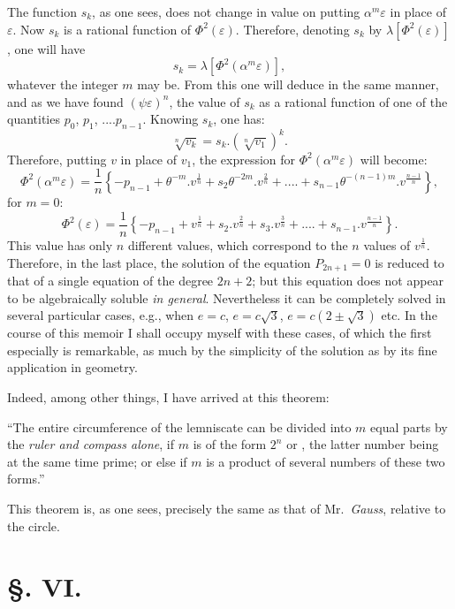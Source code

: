\documentclass{article}
\begin{document}
The function $s_{k}$, as one sees, does not change in value on putting $\alpha^{m}\varepsilon$ in place of $\varepsilon$. Now $s_{k}$ is a rational function of $\Phi^{2}(\varepsilon)$. Therefore, denoting $s_{k}$ by $\lambda[\Phi^{2}(\varepsilon)]$, one will have
\[ s_{k}=\lambda[\Phi^{2}(\alpha^{m}\varepsilon)], \]
whatever the integer $m$ may be. From this one will deduce in the same manner, and as we have found $(\psi\varepsilon)^{n}$, the value of $s_{k}$ as a rational function of one of the quantities $p_{0}$, $p_{1}$, $....p_{n-1}$. Knowing $s_{k}$, one has:
\[ \sqrt[n]{v_{k}}=s_{k}.(\sqrt[n]{v_{1}})^{k}. \]
Therefore, putting $v$ in place of $v_{1}$, the expression for $\Phi^{2}(\alpha^{m}\varepsilon)$ will become:
\[ \Phi^{2}(\alpha^{m}\varepsilon)=\frac{1}{n}\left\{-p_{n-1}+\theta^{-m}.v^{\frac{1}{n}}+s_{2}\theta^{-2m}.v^{\frac{2}{n}}+....+s_{n-1}\theta^{-(n-1)m}.v^{\frac{n-1}{n}}\right\}, \tag{116.} \]
for $m=0$:
\[ \Phi^{2}(\varepsilon)=\frac{1}{n}\left\{-p_{n-1}+v^{\frac{1}{n}}+s_{2}.v^{\frac{2}{n}}+s_{3}.v^{\frac{3}{n}}+....+s_{n-1}.v^{\frac{n-1}{n}}\right\}. \tag{117.} \]
This value has only $n$ different values, which correspond to the $n$ values of $v^{\frac{1}{n}}$. Therefore, in the last place, the solution of the equation $P_{2n+1}=0$ is reduced to that of a single equation of the degree $2n+2$; but this equation does not appear to be algebraically soluble \emph{in general}. Nevertheless it can be completely solved in several particular cases, e.g., when $e=c$, $e=c\sqrt{3}$, $e=c(2\pm\sqrt{3})$ etc. In the course of this memoir I shall occupy myself with these cases, of which the first especially is remarkable, as much by the simplicity of the solution as by its fine application in geometry.


Indeed, among other things, I have arrived at this theorem:

“The entire circumference of the lemniscate can be divided into $m$ equal parts by the \emph{ruler and compass alone}, if $m$ is of the form $2^{n}$ or , the latter number being at the same time prime; or else if $m$ is a product of several numbers of these two forms.”

This theorem is, as one sees, precisely the same as that of Mr.\ \emph{Gauss}, relative to the circle.

\section*{§. VI.}
\end{document}

